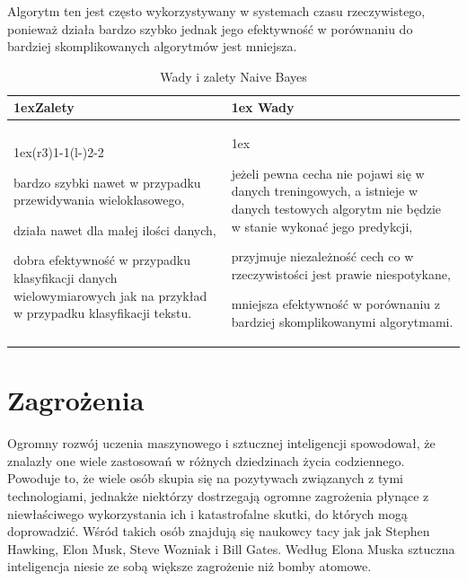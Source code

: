Algorytm ten jest często wykorzystywany w systemach czasu rzeczywistego, ponieważ działa bardzo szybko jednak
jego efektywność w porównaniu do bardziej skomplikowanych algorytmów jest mniejsza.
\begin{table}[h]
    \begin{tabularx}{\linewidth}{>{\parskip1ex}X@{\kern4\tabcolsep}>{\parskip1ex}X}
    \toprule
    \hfil\bfseries Zalety
    &
    \hfil\bfseries Wady
    \\\cmidrule(r{3\tabcolsep}){1-1}\cmidrule(l{-\tabcolsep}){2-2}
    
    bardzo szybki nawet w przypadku przewidywania wieloklasowego,\par
    działa nawet dla małej ilości danych,\par
    dobra efektywność w przypadku klasyfikacji danych wielowymiarowych
    jak na przykład w przypadku klasyfikacji tekstu.\par
    
    &
    
    jeżeli pewna cecha nie pojawi się w danych treningowych, a istnieje w danych 
    testowych algorytm nie będzie w stanie wykonać jego predykcji,\par
    przyjmuje niezależność cech co w rzeczywistości jest prawie niespotykane,\par
    mniejsza efektywność w porównaniu z bardziej skomplikowanymi algorytmami.\par
    
    \\\bottomrule
    \end{tabularx}
    \caption{Wady i zalety Naive Bayes}
\end{table}

\section{Zagrożenia}
Ogromny rozwój uczenia maszynowego i sztucznej inteligencji spowodował, że znalazły one 
wiele zastosowań w różnych dziedzinach życia codziennego. Powoduje to, że wiele osób skupia się 
na pozytywach związanych
z tymi technologiami, jednakże niektórzy dostrzegają ogromne zagrożenia płynące z niewłaściwego 
wykorzystania ich i katastrofalne skutki, do których mogą doprowadzić. 
Wśród takich osób znajdują się naukowcy tacy jak jak Stephen Hawking, Elon Musk, Steve Wozniak i Bill Gates. 
Według Elona Muska sztuczna inteligencja niesie ze sobą większe zagrożenie niż bomby atomowe. ~\cite{dangers}

